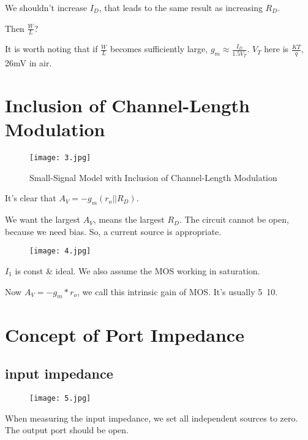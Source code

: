 \documentclass[fontset=windows]{article}
\begin{document}
We shouldn't increase $I_D$, that leads to the same result as increasing $R_D$. 

Then $\frac{W}{L}$? 

It is worth noting that if $\frac{W}{L}$ becomes sufficiently large, $g_m\approx \frac{I_D}{1.5V_T}$. 
$V_T$ here is $\frac{KT}{q}$, 26mV in air. 

\section*{Inclusion of Channel-Length Modulation}

\begin{figure}[htbp]
    \centering
    \texttt{[image: 3.jpg]}
    \captionsetup{labelformat=empty}
    \caption{Small-Signal Model with Inclusion of Channel-Length Modulation}
    \label{3}
\end{figure}

It's clear that $A_V=-g_m(r_o||R_D)$. 

We want the largest $A_V$, means the largest $R_D$. 
The circuit cannot be open, because we need bias. So, a current source is appropriate. 

\begin{figure}[htbp]
    \centering
    \texttt{[image: 4.jpg]}
    \captionsetup{labelformat=empty}
    \caption{}
    \label{4}
\end{figure}

$I_1$ is const \& ideal. We also assume the MOS working in saturation. 

Now $A_V=-g_m*r_o$, we call this intrinsic gain of MOS. It's usually 5~10. 

\section*{Concept of Port Impedance}

\subsection*{input impedance}

\begin{figure}[htbp]
    \centering
    \texttt{[image: 5.jpg]}
    \captionsetup{labelformat=empty}
    \caption{}
    \label{5}
\end{figure}

When measuring the input impedance, we set all independent sources to zero. The output port should be open. 
\end{document}
